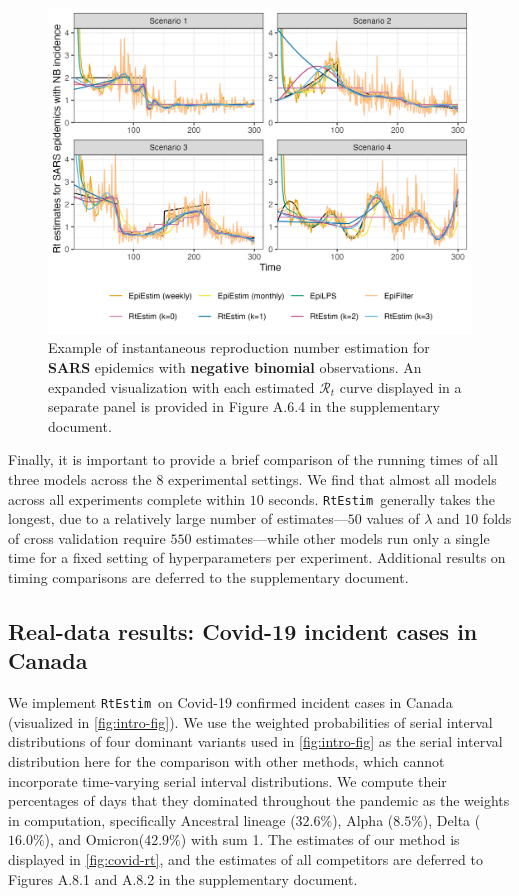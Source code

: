 \documentclass[10pt,letterpaper]{article}
\def\RtEstim{\texttt{RtEstim}}
\def\calR{\mathcal{R}}
\begin{document}
\begin{figure}[!ht]
  \centering
  \includegraphics*[width=.99\textwidth]{fig/fig_res_NB_sars.png}
  \caption{Example of instantaneous reproduction number estimation for \textbf{SARS} 
  epidemics with \textbf{negative binomial} observations. An expanded visualization 
  with each estimated $\calR_t$ curve displayed in a separate panel is provided 
  in Figure A.6.4 in the supplementary document.}
  \label{fig:nb-est-measles}
\end{figure}

Finally, it is important to provide a brief comparison of the running times of
all three models across the $8$ experimental settings. We find that almost all
models across all experiments complete within $10$ seconds. \RtEstim\ generally
takes the longest, due to a relatively large number of estimates---$50$ values
of $\lambda$ and $10$ folds of cross validation require $550$ estimates---while
other models run only a single time for a fixed setting of hyperparameters per
experiment. Additional results on timing comparisons are deferred to the
supplementary document. 


\subsection{Real-data results: Covid-19 incident cases in Canada}

We implement \RtEstim\ on Covid-19 confirmed incident cases in Canada (visualized in 
\autoref{fig:intro-fig}). 
We use the weighted probabilities of serial interval distributions of four dominant
variants used in \autoref{fig:intro-fig} as the serial interval distribution here for the
comparison with other methods, which cannot incorporate time-varying serial interval distributions. 
We compute their percentages of days that they dominated throughout the pandemic as the weights in computation, 
specifically Ancestral lineage ($32.6\%$), Alpha ($8.5\%$), Delta ($16.0\%$), and Omicron($42.9\%$) with sum 1. 
The estimates of our method is displayed in \autoref{fig:covid-rt}, and the estimates of 
all competitors are deferred to Figures A.8.1 and A.8.2 in the supplementary document. 
\end{document}
